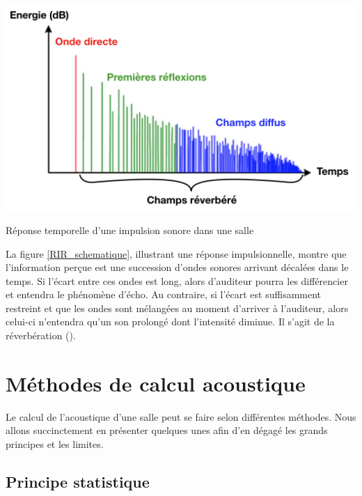 \begin{figureth}
	\includegraphics[width=\linewidth]{images/RIR_schematique}
	\caption{Réponse temporelle d'une impulsion sonore dans une salle}
	\label{RIR_schematique}
\end{figureth}

La figure \ref{RIR_schematique}, illustrant une réponse impulsionnelle, montre que l'information perçue est une succession d'ondes sonores arrivant décalées dans le temps. Si l'écart entre ces ondes est long, alors d'auditeur pourra les différencier et entendra le phénomène d'écho. Au contraire, si l'écart est suffisamment restreint et que les ondes sont mélangées au moment d'arriver à l'auditeur, alors celui-ci n'entendra qu'un son prolongé dont l'intensité diminue. Il s'agit de la réverbération (\cite[p. 39]{sabine}). 

\section{Méthodes de calcul acoustique} 
Le calcul de l'acoustique d'une salle peut se faire selon différentes méthodes. Nous allons succinctement en présenter quelques unes afin d'en dégagé les grands principes et les limites.

	\subsection{Principe statistique}

